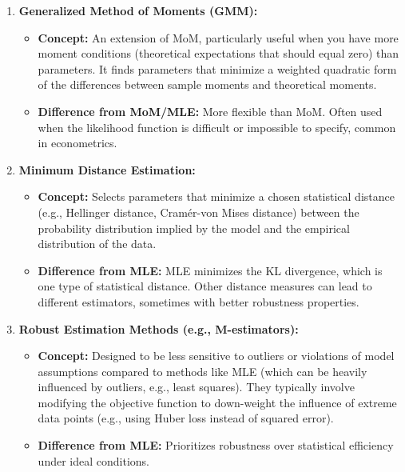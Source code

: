 \documentclass{article}
\begin{document}
\begin{enumerate}
    \item \textbf{Generalized Method of Moments (GMM):}
        \begin{itemize}[label=\textbullet, leftmargin=*]
            \item \textbf{Concept:} An extension of MoM, particularly useful when you have more moment conditions (theoretical expectations that should equal zero) than parameters. It finds parameters that minimize a weighted quadratic form of the differences between sample moments and theoretical moments.
            \item \textbf{Difference from MoM/MLE:} More flexible than MoM. Often used when the likelihood function is difficult or impossible to specify, common in econometrics.
        \end{itemize}

    \item \textbf{Minimum Distance Estimation:}
        \begin{itemize}[label=\textbullet, leftmargin=*]
            \item \textbf{Concept:} Selects parameters that minimize a chosen statistical distance (e.g., Hellinger distance, Cramér-von Mises distance) between the probability distribution implied by the model and the empirical distribution of the data.
            \item \textbf{Difference from MLE:} MLE minimizes the KL divergence, which is one type of statistical distance. Other distance measures can lead to different estimators, sometimes with better robustness properties.
        \end{itemize}

    \item \textbf{Robust Estimation Methods (e.g., M-estimators):}
        \begin{itemize}[label=\textbullet, leftmargin=*]
            \item \textbf{Concept:} Designed to be less sensitive to outliers or violations of model assumptions compared to methods like MLE (which can be heavily influenced by outliers, e.g., least squares). They typically involve modifying the objective function to down-weight the influence of extreme data points (e.g., using Huber loss instead of squared error).
            \item \textbf{Difference from MLE:} Prioritizes robustness over statistical efficiency under ideal conditions.
        \end{itemize}


\end{enumerate}
\end{document}
